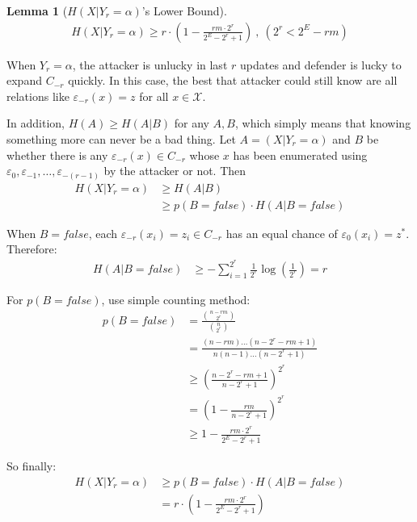 \documentclass[10pt, conference, compsocconf]{IEEEtran}
\newtheorem{mylemma}{Lemma}
\begin{document}
        \begin{mylemma}[$H(X | Y_r = \alpha)$'s Lower Bound]\label{lem1}
        \begin{align*}
            H(X|Y_r = \alpha) \geq r \cdot (1-\frac{r m \cdot 2^r}{2^E-2^r+1}) ~,~(2^r < 2^E - r m)
        \end{align*}
        \end{mylemma}

        \begin{IEEEproof}
            When $Y_r = \alpha$, the attacker
            is unlucky in last $r$ updates
            and defender is lucky
            to expand $C_{-r}$ quickly.
            In this case, the best that attacker
            could still know are all relations
            like $\varepsilon_{-r}(x) = z$ for all $x \in \mathcal X$.

            In addition, $H(A) \geq H(A|B)$ for
            any $A, B$, which simply means that knowing something
            more can never be a bad thing. Let $A = (X | Y_r = \alpha)$
            and $B$ be whether there is any $\varepsilon_{-r}(x) \in C_{-r}$ whose $x$
            has been enumerated using $\varepsilon_0, \varepsilon_{-1}, \ldots, \varepsilon_{-(r-1)}$
            by the attacker or not.
            Then
            \begin{align*}
                H(X | Y_r = \alpha) %
                    &\geq H(A | B)\\
                    &\geq p(B = false) \cdot H(A | B = false)
            \end{align*}

            When $B = false$, each $\varepsilon_{-r}(x_i) = z_i \in C_{-r}$
            has an equal chance of $\varepsilon_0(x_i) = z^*$. Therefore:
            \begin{align*}
                H(A | B = false) &\geq -\sum_{i = 1}^{2^r} \frac{1}{2^r} \log(\frac{1}{2^r})
                    = r
            \end{align*}

            For $p(B = false)$, use simple counting method:
            \begin{align*}
                p(B = false) &= \frac{\binom{n-r m}{2^r}}{\binom{n}{2^r}}\\
                    &= \frac{(n-r m)\ldots(n-2^r-r m+1)}{n(n-1)\ldots(n-2^r+1)}\\
                    &\geq (\frac{n-2^r-r m+1}{n-2^r+1})^{2^r}\\
                    &= (1-\frac{r m}{n-2^r+1})^{2^r}\\
                    &\geq 1-\frac{r m \cdot 2^r}{2^E-2^r+1}
            \end{align*}

            So finally:
            \begin{align*}
                H(X | Y_r = \alpha) &\geq p(B = false) \cdot H(A | B = false)\\
                    &= r \cdot (1-\frac{r m \cdot 2^r}{2^E-2^r+1})
            \end{align*}
        \end{IEEEproof}
\end{document}
